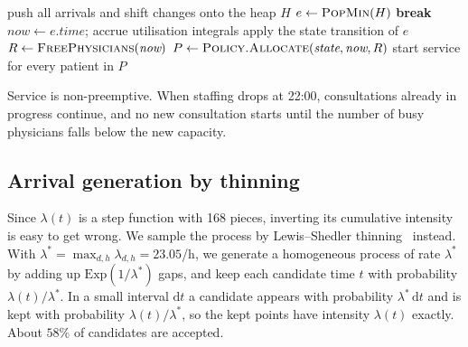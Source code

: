 \documentclass[sigconf,nonacm]{acmart}
\begin{document}
\begin{algorithm}[t]
\caption{Discrete-event main loop}
\label{alg:loop}
\begin{algorithmic}[1]
\State push all arrivals and shift changes onto the heap $H$
  \State $e \gets \textsc{PopMin}(H)$
   \textbf{break} \EndIf
  \State $\textit{now} \gets e.\textit{time}$; accrue utilisation integrals
  \State apply the state transition of $e$
  \State $R \gets \textsc{FreePhysicians}(\textit{now})$
    \State $P \gets \textsc{Policy.Allocate}(\textit{state},\textit{now},R)$
    \State start service for every patient in $P$
  \EndIf
\EndWhile
\end{algorithmic}
\end{algorithm}

Service is non-preemptive. When staffing drops at 22:00, consultations already
in progress continue, and no new consultation starts until the number of busy
physicians falls below the new capacity.

\subsection{Arrival generation by thinning}
Since $\lambda(t)$ is a step function with 168 pieces, inverting its cumulative
intensity is easy to get wrong. We sample the process by Lewis--Shedler
thinning~\cite{lewis1979thinning} instead. With
$\lambda^{*}=\max_{d,h}\lambda_{d,h}=23.05$/h, we generate a homogeneous
process of rate $\lambda^{*}$ by adding up $\mathrm{Exp}(1/\lambda^{*})$ gaps,
and keep each candidate time $t$ with probability $\lambda(t)/\lambda^{*}$. In
a small interval $\mathrm{d}t$ a candidate appears with probability
$\lambda^{*}\,\mathrm{d}t$ and is kept with probability
$\lambda(t)/\lambda^{*}$, so the kept points have intensity $\lambda(t)$
exactly. About $58\%$ of candidates are accepted.
\end{document}

